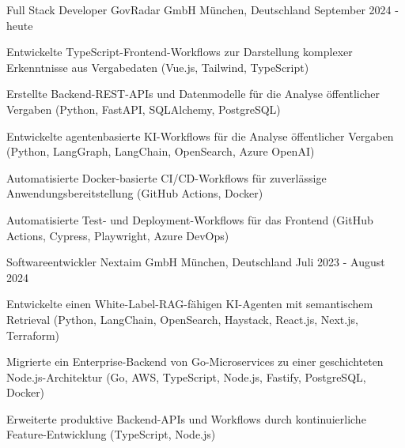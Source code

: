 


\begin{cventries}


\cventry
{Full Stack Developer} %
{GovRadar GmbH} %
{München, Deutschland} %
{September 2024 - heute} %
{ %
\begin{cvitems}
\item {Entwickelte TypeScript-Frontend-Workflows zur Darstellung komplexer Erkenntnisse aus Vergabedaten (Vue.js, Tailwind, TypeScript)}
\item {Erstellte Backend-REST-APIs und Datenmodelle für die Analyse öffentlicher Vergaben (Python, FastAPI, SQLAlchemy, PostgreSQL)}
\item {Entwickelte agentenbasierte KI-Workflows für die Analyse öffentlicher Vergaben (Python, LangGraph, LangChain, OpenSearch, Azure OpenAI)}
\item {Automatisierte Docker-basierte CI/CD-Workflows für zuverlässige Anwendungsbereitstellung (GitHub Actions, Docker)}
\item {Automatisierte Test- und Deployment-Workflows für das Frontend (GitHub Actions, Cypress, Playwright, Azure DevOps)}
\end{cvitems}
}


\cventry
{Softwareentwickler} %
{Nextaim GmbH} %
{München, Deutschland} %
{Juli 2023 - August 2024} %
{ %
\begin{cvitems}
\item {Entwickelte einen White-Label-RAG-fähigen KI-Agenten mit semantischem Retrieval (Python, LangChain, OpenSearch, Haystack, React.js, Next.js, Terraform)}
\item {Migrierte ein Enterprise-Backend von Go-Microservices zu einer geschichteten Node.js-Architektur (Go, AWS, TypeScript, Node.js, Fastify, PostgreSQL, Docker)}
\item {Erweiterte produktive Backend-APIs und Workflows durch kontinuierliche Feature-Entwicklung (TypeScript, Node.js)}
\end{cvitems}
}


\end{cventries}
